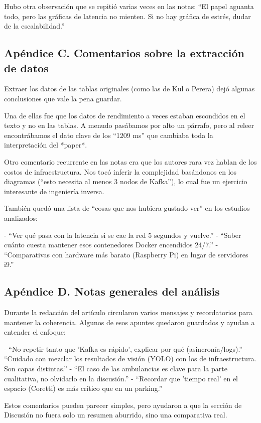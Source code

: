 Hubo otra observación que se repitió varias veces en las notas:  
``El papel aguanta todo, pero las gráficas de latencia no mienten. Si no hay gráfica de estrés, dudar de la escalabilidad.''

\subsection*{Apéndice C. Comentarios sobre la extracción de datos}

Extraer los datos de las tablas originales (como las de Kul o Perera) dejó algunas conclusiones que vale la pena guardar.

Una de ellas fue que los datos de rendimiento a veces estaban escondidos en el texto y no en las tablas. A menudo pasábamos por alto un párrafo, pero al releer encontrábamos el dato clave de los ``1209 ms'' que cambiaba toda la interpretación del *paper*.

Otro comentario recurrente en las notas era que los autores rara vez hablan de los costos de infraestructura. Nos tocó inferir la complejidad basándonos en los diagramas (``esto necesita al menos 3 nodos de Kafka''), lo cual fue un ejercicio interesante de ingeniería inversa.

También quedó una lista de ``cosas que nos hubiera gustado ver'' en los estudios analizados:

- ``Ver qué pasa con la latencia si se cae la red 5 segundos y vuelve.''
- ``Saber cuánto cuesta mantener esos contenedores Docker encendidos 24/7.''
- ``Comparativas con hardware más barato (Raspberry Pi) en lugar de servidores i9.''

\subsection*{Apéndice D. Notas generales del análisis}

Durante la redacción del artículo circularon varios mensajes y recordatorios para mantener la coherencia. Algunos de esos apuntes quedaron guardados y ayudan a entender el enfoque:

- ``No repetir tanto que 'Kafka es rápido', explicar por qué (asincronía/logs).''  
- ``Cuidado con mezclar los resultados de visión (YOLO) con los de infraestructura. Son capas distintas.''  
- ``El caso de las ambulancias es clave para la parte cualitativa, no olvidarlo en la discusión.''  
- ``Recordar que 'tiempo real' en el espacio (Coretti) es más crítico que en un parking.''

Estos comentarios pueden parecer simples, pero ayudaron a que la sección de Discusión no fuera solo un resumen aburrido, sino una comparativa real.

